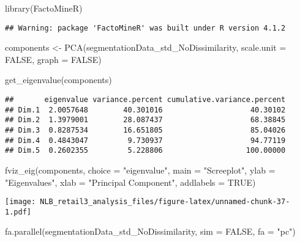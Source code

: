 \documentclass[
]{article}
\newenvironment{Shaded}{\begin{snugshade}}{\end{snugshade}}
\newcommand{\AttributeTok}[1]{\textcolor[rgb]{0.77,0.63,0.00}{#1}}
\newcommand{\ConstantTok}[1]{\textcolor[rgb]{0.00,0.00,0.00}{#1}}
\newcommand{\FunctionTok}[1]{\textcolor[rgb]{0.00,0.00,0.00}{#1}}
\newcommand{\NormalTok}[1]{#1}
\newcommand{\OtherTok}[1]{\textcolor[rgb]{0.56,0.35,0.01}{#1}}
\newcommand{\StringTok}[1]{\textcolor[rgb]{0.31,0.60,0.02}{#1}}
\begin{document}
\begin{Shaded}
\begin{Highlighting}[]
\FunctionTok{library}\NormalTok{(FactoMineR)}
\end{Highlighting}
\end{Shaded}

\begin{verbatim}
## Warning: package 'FactoMineR' was built under R version 4.1.2
\end{verbatim}

\begin{Shaded}
\begin{Highlighting}[]
\NormalTok{components }\OtherTok{\textless{}{-}} \FunctionTok{PCA}\NormalTok{(segmentationData\_std\_NoDissimilarity, }\AttributeTok{scale.unit =} \ConstantTok{FALSE}\NormalTok{, }\AttributeTok{graph =} \ConstantTok{FALSE}\NormalTok{)}

\FunctionTok{get\_eigenvalue}\NormalTok{(components)}
\end{Highlighting}
\end{Shaded}

\begin{verbatim}
##       eigenvalue variance.percent cumulative.variance.percent
## Dim.1  2.0057648        40.301016                    40.30102
## Dim.2  1.3979001        28.087437                    68.38845
## Dim.3  0.8287534        16.651805                    85.04026
## Dim.4  0.4843047         9.730937                    94.77119
## Dim.5  0.2602355         5.228806                   100.00000
\end{verbatim}

\begin{Shaded}
\begin{Highlighting}[]
\FunctionTok{fviz\_eig}\NormalTok{(components, }\AttributeTok{choice =} \StringTok{"eigenvalue"}\NormalTok{, }\AttributeTok{main =} \StringTok{"Screeplot"}\NormalTok{, }\AttributeTok{ylab =} \StringTok{"Eigenvalues"}\NormalTok{, }\AttributeTok{xlab =} \StringTok{"Principal Component"}\NormalTok{, }\AttributeTok{addlabels =} \ConstantTok{TRUE}\NormalTok{)}
\end{Highlighting}
\end{Shaded}

\texttt{[image: NLB\_retail3\_analysis\_files/figure-latex/unnamed-chunk-37-1.pdf]}

\begin{Shaded}
\begin{Highlighting}[]
\FunctionTok{fa.parallel}\NormalTok{(segmentationData\_std\_NoDissimilarity, }\AttributeTok{sim =} \ConstantTok{FALSE}\NormalTok{, }\AttributeTok{fa =} \StringTok{"pc"}\NormalTok{)}
\end{Highlighting}
\end{Shaded}
\end{document}

